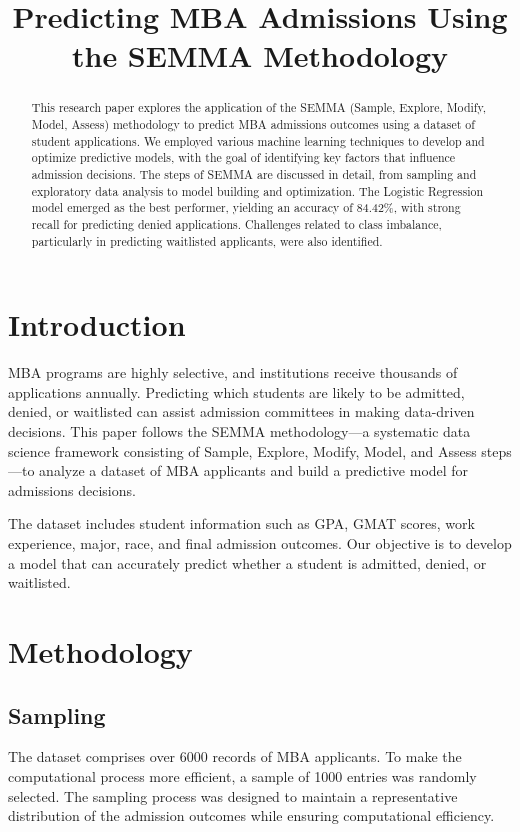\documentclass{article}
\title{Predicting MBA Admissions Using the SEMMA Methodology}
\author{}
\date{}
\begin{document}
\maketitle

\begin{abstract}
This research paper explores the application of the SEMMA (Sample, Explore, Modify, Model, Assess) methodology to predict MBA admissions outcomes using a dataset of student applications. We employed various machine learning techniques to develop and optimize predictive models, with the goal of identifying key factors that influence admission decisions. The steps of SEMMA are discussed in detail, from sampling and exploratory data analysis to model building and optimization. The Logistic Regression model emerged as the best performer, yielding an accuracy of 84.42\%, with strong recall for predicting denied applications. Challenges related to class imbalance, particularly in predicting waitlisted applicants, were also identified.
\end{abstract}

\section{Introduction}

MBA programs are highly selective, and institutions receive thousands of applications annually. Predicting which students are likely to be admitted, denied, or waitlisted can assist admission committees in making data-driven decisions. This paper follows the SEMMA methodology—a systematic data science framework consisting of Sample, Explore, Modify, Model, and Assess steps—to analyze a dataset of MBA applicants and build a predictive model for admissions decisions.

The dataset includes student information such as GPA, GMAT scores, work experience, major, race, and final admission outcomes. Our objective is to develop a model that can accurately predict whether a student is admitted, denied, or waitlisted.

\section{Methodology}

\subsection{Sampling}
The dataset comprises over 6000 records of MBA applicants. To make the computational process more efficient, a sample of 1000 entries was randomly selected. The sampling process was designed to maintain a representative distribution of the admission outcomes while ensuring computational efficiency.
\end{document}
